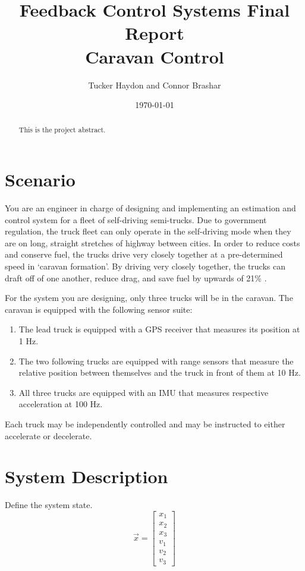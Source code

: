 \documentclass[12pt,onecolumn,reqno]{amsart}
\begin{document}
\title[]{Feedback Control Systems Final Report \\ Caravan Control}
\author[]{Tucker Haydon and Connor Brashar}
\address{The University of Texas at Austin}
\date{\today}
\begin{abstract}
  This is the project abstract.
\end{abstract}
\maketitle


\section{Scenario}
You are an engineer in charge of designing and implementing an estimation and
control system for a fleet of self-driving semi-trucks. Due to government
regulation, the truck fleet can only operate in the self-driving mode when they
are on long, straight stretches of highway between cities. In order to reduce
costs and conserve fuel, the trucks drive very closely together at a
pre-determined speed in `caravan formation'. By driving very closely together,
the trucks can draft off of one another, reduce drag, and save fuel by upwards
of 21\% \cite{bonnet2000fuel}.

For the system you are designing, only three trucks will be in the caravan. The
caravan is equipped with the following sensor suite: 
\begin{enumerate}
  \item The lead truck is equipped with a GPS receiver that measures its
    position at 1 Hz.
  \item The two following trucks are equipped with range sensors that measure
    the relative position between themselves and the truck in front of them at
    10 Hz.
  \item All three trucks are equipped with an IMU that measures respective
    acceleration at 100 Hz.
\end{enumerate}

Each truck may be independently controlled and may be instructed to either
accelerate or decelerate.

\section{System Description}
Define the system state.
\begin{equation}
  \vec{x} = 
  \begin{bmatrix}
    x_{1} \\
    x_{2} \\
    x_{3} \\
    v_{1} \\
    v_{2} \\
    v_{3}
  \end{bmatrix}
\end{equation}
\end{document}
